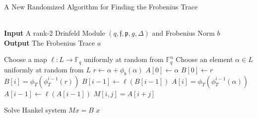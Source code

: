 \documentclass{jams-l}
\theoremstyle{remark}
\numberwithin{equation}{section}
\newcommand{\frakf}{\mathfrak{f}}
\begin{document}
 \begin{algorithm}
\caption{A New Randomized Algorithm for Finding the Frobenius Trace}\label{euclid}
\begin{algorithmic}[1]
 \\
\hspace*{\algorithmicindent} \textbf{Input} A rank-2 Drinfeld Module $(q,\frakf,\mathfrak{p}, g, \Delta)$ and Frobenius Norm $b$\\
 \hspace*{\algorithmicindent} \textbf{Output} The Frobenius Trace $a$
 
 \State Choose a map $\ell: L \to \mathbb{F}_q$ uniformly at random from $\mathbb{F}_q^n$
 \State Choose an element $\alpha \in L$ uniformly at random from $L$
\State $r \gets \alpha + \phi_b(\alpha)$
\State $A[0] \gets \alpha$
\State $B[0] \gets r$
\State $B[i] = \phi_T(\phi_T^{i-1}(r))$
\State $B[i-1] \gets \ell(B[i-1])$
\EndFor
{}
\State $A[i] = \phi_T(\phi_T^{i-1}(\alpha))$
\State $A[i-1] \gets \ell(A[i-1])$
\EndFor
{}
\State $M[i,j] = A[i + j]$
\EndFor
\EndFor

\State Solve Hankel system $Mx = B$
\Return $x$

\EndProcedure
\end{algorithmic}
\end{algorithm}







\end{document}
